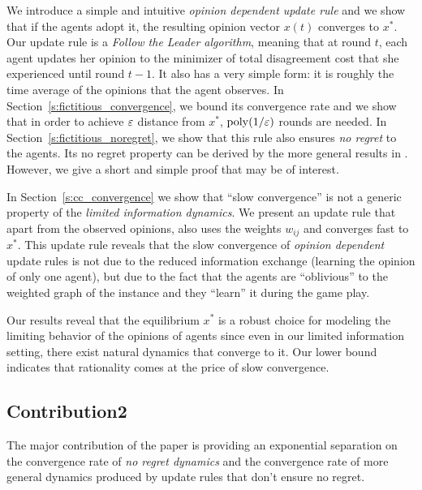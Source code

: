We introduce a simple and intuitive \emph{opinion dependent update rule} and we
show that if the agents adopt it, the resulting opinion vector $x(t)$ converges
to $x^*$.  Our update rule is a \emph{Follow the Leader algorithm}, meaning
that at round $t$, each agent updates her opinion to the minimizer of total
disagreement cost that she experienced until round $t-1$.  It also has a very
simple form: it is roughly the time average of the opinions that the agent
observes.  In Section~\ref{s:fictitious_convergence}, we bound its convergence
rate and we show that in order to achieve $\varepsilon$ distance from $x^*$,
$\mathrm{poly}(1/\varepsilon)$ rounds are needed.  In
Section~\ref{s:fictitious_noregret}, we show that this rule also ensures
\emph{no regret} to the agents.  Its no regret property can be derived by the
more general results in \cite{HAK07}.  However, we give a short and simple
proof that may be of interest.

In Section~\ref{s:cc_convergence} we show that \enquote{slow convergence} is
not a generic property of the \emph{limited information dynamics}.  We present
an update rule that apart from the observed opinions, also uses the weights
$w_{ij}$ and converges fast to $x^*$.  This update rule reveals that the slow
convergence of \emph{opinion dependent} update rules is not due to the reduced
information exchange (learning the opinion of only one agent), but due to the
fact that the agents are \enquote{oblivious} to the weighted graph of the
instance and they \enquote{learn} it during the game play.

Our results reveal that the equilibrium $x^*$ is a robust choice for modeling
the limiting behavior of the opinions of agents since even in our limited
information setting, there exist natural dynamics that converge to it.  Our
lower bound indicates that rationality comes at the price of slow
convergence.

\subsection{Contribution2} 
The major contribution of the paper is providing 
an exponential separation on the convergence
rate of \emph{no regret dynamics} and the convergence
rate of more general dynamics produced by update rules
that don't ensure no regret.

